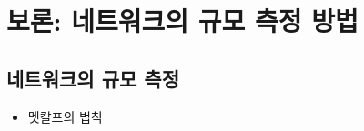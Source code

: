 \chapter*{보론: 네트워크의 규모 측정 방법}   
\section*{네트워크의 규모 측정}   
\begin{itemize}
\item 멧칼프의 법칙
\end{itemize}